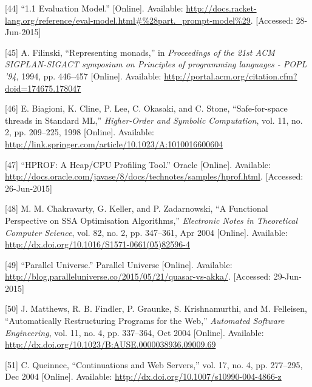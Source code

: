 \documentclass[12pt,a4paper,oneside,openright]{book}
\begin{document}
{
{[}44{]} ``1.1 Evaluation Model.'' {[}Online{]}. Available:
\url{http://docs.racket-lang.org/reference/eval-model.html\#\%28part._prompt-model\%29}.
{[}Accessed: 28-Jun-2015{]}

{[}45{]} A. Filinski, ``Representing monads,'' in \emph{Proceedings of
the 21st ACM SIGPLAN-SIGACT symposium on Principles of programming
languages - POPL '94}, 1994, pp. 446--457 {[}Online{]}. Available:
\url{http://portal.acm.org/citation.cfm?doid=174675.178047}

{[}46{]} E. Biagioni, K. Cline, P. Lee, C. Okasaki, and C. Stone,
``Safe-for-space threads in Standard ML,'' \emph{Higher-Order and
Symbolic Computation}, vol. 11, no. 2, pp. 209--225, 1998 {[}Online{]}.
Available:
\url{http://link.springer.com/article/10.1023/A:1010016600604}

{[}47{]} ``HPROF: A Heap/CPU Profiling Tool.'' Oracle {[}Online{]}.
Available:
\url{http://docs.oracle.com/javase/8/docs/technotes/samples/hprof.html}.
{[}Accessed: 26-Jun-2015{]}

{[}48{]} M. M. Chakravarty, G. Keller, and P. Zadarnowski, ``A
Functional Perspective on SSA Optimisation Algorithms,''
\emph{Electronic Notes in Theoretical Computer Science}, vol. 82, no. 2,
pp. 347--361, Apr 2004 {[}Online{]}. Available:
\url{http://dx.doi.org/10.1016/S1571-0661(05)82596-4}

{[}49{]} ``Parallel Universe.'' Parallel Universe {[}Online{]}.
Available:
\url{http://blog.paralleluniverse.co/2015/05/21/quasar-vs-akka/}.
{[}Accessed: 29-Jun-2015{]}

{[}50{]} J. Matthews, R. B. Findler, P. Graunke, S. Krishnamurthi, and
M. Felleisen, ``Automatically Restructuring Programs for the Web,''
\emph{Automated Software Engineering}, vol. 11, no. 4, pp. 337--364, Oct
2004 {[}Online{]}. Available:
\url{http://dx.doi.org/10.1023/B:AUSE.0000038936.09009.69}

{[}51{]} C. Queinnec, ``Continuations and Web Servers,'' vol. 17, no. 4,
pp. 277--295, Dec 2004 {[}Online{]}. Available:
\url{http://dx.doi.org/10.1007/s10990-004-4866-z}

}
\end{document}
